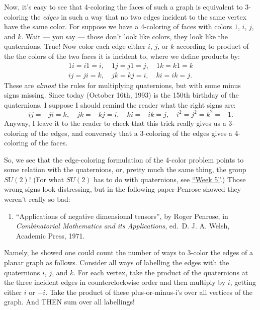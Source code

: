 \documentclass{article}
\def\tightlist{}
\begin{document}
Now, it's easy to see that 4-coloring the faces of such a graph is
equivalent to 3-coloring the \emph{edges} in such a way that no two
edges incident to the same vertex have the same color. For suppose we
have a 4-coloring of faces with colors \(1\), \(i\), \(j\), and \(k\).
Wait --- you say --- those don't look like colors, they look like the
quaternions. True! Now color each edge either \(i\), \(j\), or \(k\)
according to product of the the colors of the two faces it is incident
to, where we define products by:
\[\begin{gathered}1i = i1 = i, \quad 1j = j1 = j, \quad 1k = k1 = k \\ ij = ji = k, \quad jk = kj = i, \quad ki = ik = j.\end{gathered}\]
These are \emph{almost} the rules for multiplying quaternions, but with
some minus signs missing. Since today (October 16th, 1993) is the 150th
birthday of the quaternions, I suppose I should remind the reader what
the right signs are:
\[ij = -ji = k, \quad jk = -kj = i, \quad  ki = -ik = j, \quad i^2 = j^2 = k^2 = -1.\]
Anyway, I leave it to the reader to check that this trick really gives
us a 3-coloring of the edges, and conversely that a 3-coloring of the
edges gives a 4-coloring of the faces.

So, we see that the edge-coloring formulation of the 4-color problem
points to some relation with the quaternions, or, pretty much the same
thing, the group \(SU(2)\)! (For what \(SU(2)\) has to do with
quaternions, see \protect\hyperlink{week5}{``Week 5''}.) Those wrong
signs look distressing, but in the following paper Penrose showed they
weren't really so bad:

\begin{enumerate}
\def\labelenumi{\arabic{enumi})}
\setcounter{enumi}{3}
\tightlist
\item
  ``Applications of negative dimensional tensors'', by Roger Penrose, in
  \emph{Combinatorial Mathematics and its Applications}, ed.~D. J. A.
  Welsh, Academic Press, 1971.
\end{enumerate}

Namely, he showed one could count the number of ways to 3-color the
edges of a planar graph as follows. Consider all ways of labelling the
edges with the quaternions \(i\), \(j\), and \(k\). For each vertex,
take the product of the quaternions at the three incident edges in
counterclockwise order and then multiply by \(i\), getting either \(i\)
or \(-i\). Take the product of these plus-or-minus-i's over all vertices
of the graph. And THEN sum over all labellings!
\end{document}
